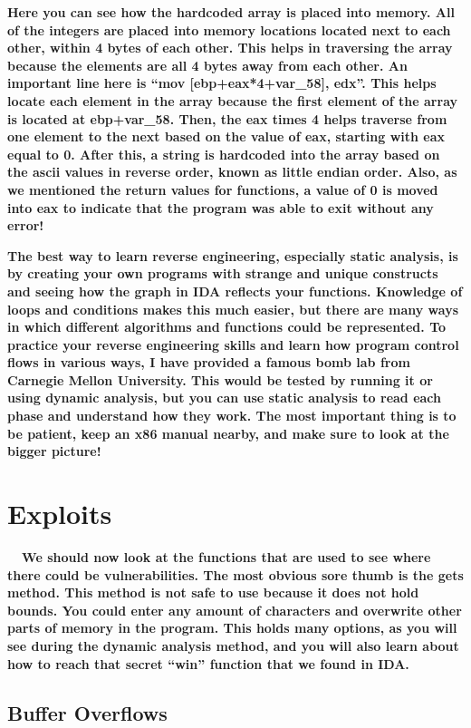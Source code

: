 \documentclass[letterpaper]{article}
\newcommand{\sitfig}[3]{
\begin{figure}[H]
\centering
\makebox[\textwidth][c]{
#2
}
\label{#1}
\end{figure}
}
\newcommand{\sitgfx}[4][scale=1.0]{
\sitfig{#3}{\texttt{[image: \#2]}}{#4}
}
\begin{document}
  
\sitgfx[width=6.5in,height=4.5311in]{FINALWORKINGDOCFORMERLYPRECURSOR-img072.png}{fig:unk}{TODO CAPTION}
 

\textbf{Here you can see how the hardcoded array is placed into memory. All of the integers are placed into memory
locations located next to each other, within 4 bytes of each other. This helps in traversing the array because the
elements are all 4 bytes away from each other. An important line here is ``mov [ebp+eax*4+var\_58], edx''. This helps
locate each element in the array because the first element of the array is located at ebp+var\_58. Then, the eax times
4 helps traverse from one element to the next based on the value of eax, starting with eax equal to 0. After this, a
string is hardcoded into the array based on the ascii values in reverse order, known as little endian order. Also, as
we mentioned the return values for functions, a value of 0 is moved into eax to indicate that the program was able to
exit without any error!}

\textbf{The best way to learn reverse engineering, especially static analysis, is by creating your own programs with
strange and unique constructs and seeing how the graph in IDA reflects your functions. Knowledge of loops and
conditions makes this much easier, but there are many ways in which different algorithms and functions could be
represented. To practice your reverse engineering skills and learn how program control flows in various ways, I have
provided a famous bomb lab from Carnegie Mellon University. This would be tested by running it or using dynamic
analysis, but you can use static analysis to read each phase and understand how they work. The most important thing is
to be patient, keep an x86 manual nearby, and make sure to look at the bigger picture!}

\section{Exploits}

\textbf{ \ \ We should now look at the functions that are used to see where there could be vulnerabilities. The most
obvious sore thumb is the gets method. This method is not safe to use because it does not hold bounds. You could enter
any amount of characters and overwrite other parts of memory in the program. This holds many options, as you will see
during the dynamic analysis method, and you will also learn about how to reach that secret ``win'' function that we
found in IDA.}

\subsection{Buffer Overflows}
\end{document}
